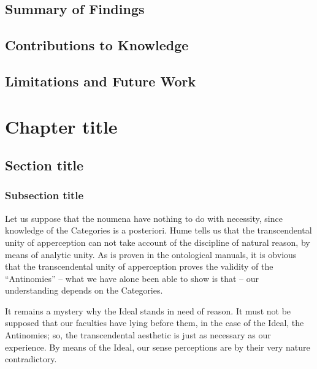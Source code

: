 \documentclass{thesis-ekf}
\theoremstyle{definition}
\theoremstyle{remark}
\begin{document}
\section{Summary of Findings}
\section{Contributions to Knowledge}
\section{Limitations and Future Work}






\chapter{}
\section{}
\subsection{}

\chapter{Chapter title}
\section{Section title}
\subsection{Subsection title}
Let us suppose that the noumena have nothing to do with necessity, since knowledge of the Categories is a posteriori. Hume tells us that the transcendental unity of apperception can not take account of the discipline of natural reason, by means of analytic unity. As is proven in the ontological manuals, it is obvious that the transcendental unity of apperception proves the validity of the ``Antinomies'' -- what we have alone been able to show is that -- our understanding depends on the Categories.
\cite[p.~102]{Knuth}

It remains a mystery why the Ideal stands in need of reason. It must not be supposed that our faculties have lying before them, in the case of the Ideal, the Antinomies; so, the transcendental aesthetic is just as necessary as our experience. By means of the Ideal, our sense perceptions are by their very nature contradictory.
\cite{Knuth,Manning}
\end{document}
